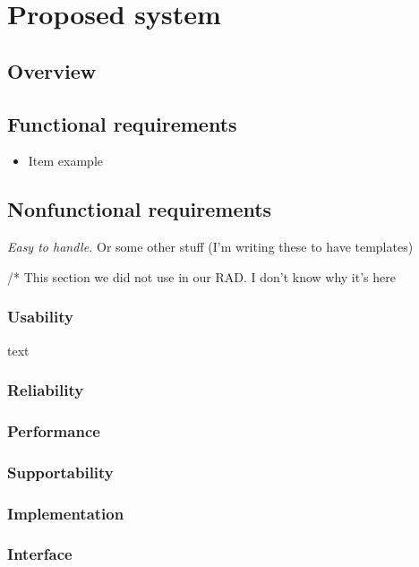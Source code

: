 \chapter{Proposed system}
\label{sec:proposed system}

\section{Overview}


\section{Functional requirements}
\begin{itemize}
	\setlength{\itemsep}{-5pt}
	\item Item example
\end{itemize}

\section{Nonfunctional requirements}

\emph{Easy to handle.} Or some other stuff (I'm writing these to have templates)

/* This section we did not use in our RAD. I don't know why it's here
\subsection{Usability}
text

\subsection{Reliability}

\subsection{Performance}

\subsection{Supportability}

\subsection{Implementation}

\subsection{Interface}

